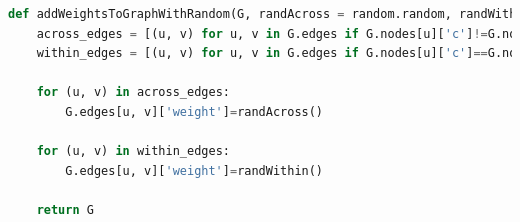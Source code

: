 \begin{lstlisting}[language=python,caption=Súlyok hozzáadása gráfhoz,label=code:graphAddWeights]	
def addWeightsToGraphWithRandom(G, randAcross = random.random, randWithin = random.random):
	across_edges = [(u, v) for u, v in G.edges if G.nodes[u]['c']!=G.nodes[v]['c']]
	within_edges = [(u, v) for u, v in G.edges if G.nodes[u]['c']==G.nodes[v]['c']]
	
	for (u, v) in across_edges:
		G.edges[u, v]['weight']=randAcross()
	
	for (u, v) in within_edges:
		G.edges[u, v]['weight']=randWithin()
		
	return G
	
\end{lstlisting}

%
%
%
%
%
%
%
%
%	

